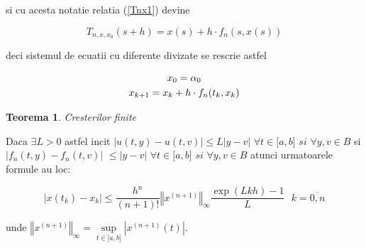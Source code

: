 \documentclass[a4paper,twoside]{book}
\newtheorem{theorem}{Teorema}
\begin{document}
si cu acesta notatie relatia (\ref{Tnx1}) devine

\begin{equation}
T_{n,x,x_{0}}(s+h)=x(s)+h\cdot f_{n}(s,x(s))  \label{EC1}
\end{equation}

deci sistemul de ecuatii cu diferente divizate se rescrie astfel

\begin{gather}
x_{0}=\alpha _{0}  \label{difdiv1} \\
x_{k+1}=x_{k}+h\cdot f_{n}(t_{k},x_{k})  \notag
\end{gather}

\begin{theorem}
Cresterilor finite
\end{theorem}

Daca $\exists L>0$ astfel incit $\left\vert u(t,y)-u(t,v)\right\vert \leq
L\left\vert y-v\right\vert $ $\forall t\in \lbrack a,b]\,\,si\,\,\forall
y,v\in B$ si $\left\vert f_{n}(t,y)-f_{n}(t,v)\right\vert $ $\leq \left\vert
y-v\right\vert \,\,\forall t\in \lbrack a,b]\,\,si\,\,\forall y,v\in B$
atunci urmatoarele formule au loc:

\begin{equation}
\left\vert x(t_{k})-x_{k}\right\vert \leq \frac{h^{n}}{(n+1)!}\left\Vert
x^{(n+1)}\right\Vert _{\infty }\frac{\exp (Lkh)-1}{L}\,\,\,\,k=\overline{0,n}
\label{t1}
\end{equation}

unde $\left\Vert x^{(n+1)}\right\Vert _{\infty }=\underset{t\in \lbrack a,b]}%
{\sup }\left\vert x^{(n+1)}(t)\right\vert $.
\end{document}
